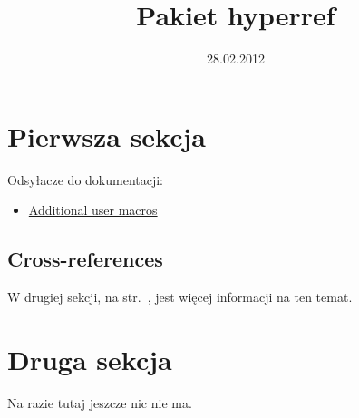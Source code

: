 \documentclass[a4paper,12pt]{article}
\title{Pakiet hyperref}
\date{28.02.2012}
\begin{document}
\maketitle
\tableofcontents

\newpage
\section{Pierwsza sekcja}

Odsyłacze do dokumentacji:

\begin{itemize}
\item \href{ftp://sunsite.icm.edu.pl/pub/CTAN/macros/latex/contrib/hyperref/doc/manual.html#x1-130004}{Additional user macros}
\end{itemize}

\subsection{Cross-references}

W drugiej sekcji, na str.~\pageref{crossref},
jest więcej informacji na ten temat.

\newpage
\section{Druga sekcja}

Na razie tutaj jeszcze nic nie ma.\label{crossref}
\end{document}
